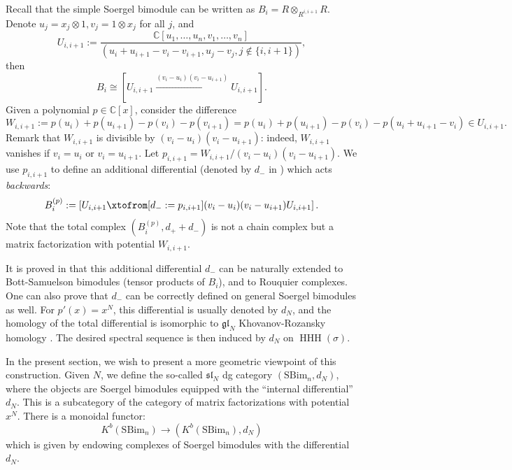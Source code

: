 \documentclass[12pt]{amsart}
\numberwithin{equation}{section}
\theoremstyle{definition}
\theoremstyle{remark}
\newtheorem{remark}[theorem]{Remark}
\DeclareMathOperator{\HHH}{HHH}
\newcommand{\CC}{\mathbb{C}}
\renewcommand{\1}{\mathbf{1}}
\newcommand{\SBim}{\mathrm{SBim}}
\newcommand{\fsl}{\mathfrak{sl}}
\newcommand{\fgl}{\mathfrak{gl}}
\begin{document}
Recall that the simple Soergel bimodule can be written as $B_i=R \otimes_{R^{i,i+1}} R$.
Denote $u_j=x_j\otimes 1, v_j=1\otimes x_j$ for all $j$, and
$$
U_{i,i+1}:=\frac{\CC[u_1,\ldots,u_n,v_1,\ldots,v_n]}{(u_i+u_{i+1}-v_i-v_{i+1},u_j-v_j,j\notin \{i,i+1\})}, 
$$
then
$$
B_i\cong \left[U_{i,i+1}\xrightarrow{(v_i-u_i)(v_i-u_{i+1})}U_{i,i+1}\right].
$$
Given a polynomial $p\in \CC[x]$, consider the difference
$$
W_{i,i+1}:=p(u_i)+p(u_{i+1})-p(v_i)-p(v_{i+1})=p(u_i)+p(u_{i+1})-p(v_i)-p(u_i+u_{i+1}-v_i)\in U_{i,i+1}.
$$
Remark that $W_{i,i+1}$ is divisible by $(v_i-u_i)(v_i-u_{i+1})$: indeed, $W_{i,i+1}$ vanishes if $v_i=u_i$ or $v_i=u_{i+1}$.
Let $p_{i,i+1}=W_{i,i+1}/(v_i-u_i)(v_i-u_{i+1})$.  We use $p_{i,i+1}$ to define an additional differential (denoted by $d_{-}$ in \cite{RasDiff}) which acts {\em backwards}:
\begin{equation}
\label{bs with potential}
B_i^{(p)}:=\left[U_{i,i+1}\xtofrom[d_{-}:=p_{i,i+1}]{(v_i-u_i)(v_i-u_{i+1})}U_{i,i+1}\right].
\end{equation}
Note that the total complex $(B_i^{(p)},d_++d_-)$ is not a chain complex but a matrix factorization with potential $W_{i,i+1}$.

It is proved in \cite{RasDiff} that this additional differential $d_{-}$ can be naturally extended to Bott-Samuelson bimodules (tensor products of $B_i$), and to Rouquier complexes. One can also prove \cite{Becker} that $d_{-}$ can be correctly defined on general Soergel bimodules as well.
For $p'(x)=x^N$, this differential is usually denoted by $d_N$, and the homology of the total differential is isomorphic to $\fgl_N$ Khovanov-Rozansky homology \cite{KhR1}. The desired spectral sequence is then induced by $d_N$ on $\HHH(\sigma)$. 



In the present section, we wish to present a more geometric viewpoint of this construction. Given $N$, we define the so-called $\fsl_N$ dg category $(\SBim_n,d_N)$, where the objects are Soergel bimodules equipped with the ``internal differential'' $d_N$. This is a subcategory of the category of matrix factorizations with potential $x^N$. There is a monoidal functor: 
$$
K^b(\SBim_n) \to \left( K^b(\SBim_n), d_N \right)
$$
which is given by endowing complexes of Soergel bimodules with the differential $d_N$.
\end{document}
